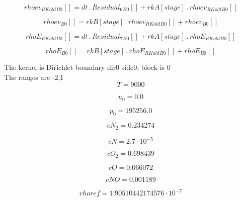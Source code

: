 \documentclass{article}
\begin{document}
\begin{dmath}{rhoev_{RKold}{_{B0}}}[{}] = dt \,.\, {Residual_{6}{_{B0}}}[{}] + {rkA}[{stage}] \,.\, {rhoev_{RKold}{_{B0}}}[{}]\end{dmath}

\begin{dmath}{rhoev{_{B0}}}[{}] = {rkB}[{stage}] \,.\, {rhoev_{RKold}{_{B0}}}[{}] + {rhoev{_{B0}}}[{}]\end{dmath}

\begin{dmath}{rhoE_{RKold}{_{B0}}}[{}] = dt \,.\, {Residual_{7}{_{B0}}}[{}] + {rkA}[{stage}] \,.\, {rhoE_{RKold}{_{B0}}}[{}]\end{dmath}

\begin{dmath}{rhoE{_{B0}}}[{}] = {rkB}[{stage}] \,.\, {rhoE_{RKold}{_{B0}}}[{}] + {rhoE{_{B0}}}[{}]\end{dmath}

\noindent The kernel is Dirichlet boundary dir0 side0, block is 0\\\noindent The ranges are -2,1\\\begin{dmath}T = 9000\end{dmath}

\begin{dmath}u_{0} = 0.0\end{dmath}

\begin{dmath}p_{0} = 195256.0\end{dmath}

\begin{dmath}cN_{2} = 0.234274\end{dmath}

\begin{dmath}cN = 2.7 \cdot 10^{-5}\end{dmath}

\begin{dmath}cO_{2} = 0.698439\end{dmath}

\begin{dmath}cO = 0.066072\end{dmath}

\begin{dmath}cNO = 0.001189\end{dmath}

\begin{dmath}rhoref = 1.90510442174576 \cdot 10^{-7}\end{dmath}
\end{document}
